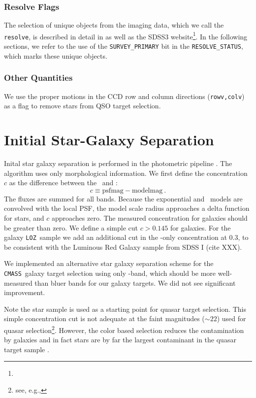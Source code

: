 \documentclass[12pt,preprint]{aastex}
\newcommand{\loz}{\texttt{LOZ}}
\newcommand{\cmass}{\texttt{CMASS}}
\begin{document}
\subsubsection{Resolve Flags} \label{sec:resolve}

The selection of unique objects from the imaging data, which we call the
\texttt{resolve}, is described in detail in \citet{dr8} as well as the SDSS3
website\footnote{\DRateresolve}.  In the following sections, we refer to the
use of the \texttt{SURVEY\_PRIMARY} bit in the \texttt{RESOLVE\_STATUS}, which
marks these unique objects.

\subsubsection{Other Quantities}

We use the proper motions in the CCD row and column directions
(\texttt{rowv,colv}) as a flag to remove stars from QSO target selection.


\section{Initial Star-Galaxy Separation} \label{sec:sgsep}

Inital star galaxy separation is performed in the photometric pipeline \photo.
The algorithm uses only morphological information.  We first define
the concentration $c$ as the difference between the 
\psfmag\ and \modelmag:
\begin{equation}
c \equiv \textrm{psfmag} - \textrm{modelmag}~.
\end{equation}
The fluxes are summed for all bands.  Because the exponential and
\devauc\ models are convolved with the local PSF, the model scale radius
approaches a delta function for stars, and $c$ approaches zero.  The measured
concentration for galaxies should be greater than zero.  We define a simple cut
$c > 0.145$ for galaxies.  For the galaxy \loz\ sample we add an additional
cut in the \rmag-only concentration at 0.3, to be consistent with 
the Luminous Red Galaxy sample from SDSS I (cite XXX).

We implemented an alternative star galaxy separation scheme for the \cmass\
galaxy target selection using only \imag-band, which should be more
well-measured than bluer bands for our galaxy targets. We did not see
significant improvement.

Note the star sample is used as a starting point for quasar target selection.
This simple concentration cut is not adequate at the faint magnitudes
(\gmag$\sim 22$) used for quasar selection\footnote{see, e.g., \DRsevsg}.
However, the color based selection reduces the contamination by galaxies and in
fact stars are by far the largest contaminant in the quasar target sample
\citep{RossQTS}.
\end{document}
